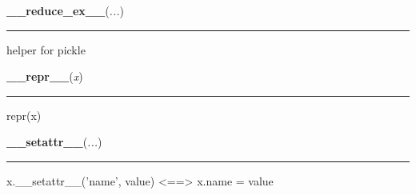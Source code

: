    \label{object:__reduce_ex__}

    \vspace{0.5ex}

    \begin{boxedminipage}{\textwidth}

    \raggedright \textbf{\_\_reduce\_ex\_\_}(\textit{...})

    \vspace{-1.5ex}

    \rule{\textwidth}{0.5\fboxrule}
    helper for pickle

    \vspace{1ex}

    \end{boxedminipage}

    \label{object:__repr__}

    \vspace{0.5ex}

    \begin{boxedminipage}{\textwidth}

    \raggedright \textbf{\_\_repr\_\_}(\textit{x})

    \vspace{-1.5ex}

    \rule{\textwidth}{0.5\fboxrule}
    repr(x)

    \vspace{1ex}

    \end{boxedminipage}

    \label{object:__setattr__}

    \vspace{0.5ex}

    \begin{boxedminipage}{\textwidth}

    \raggedright \textbf{\_\_setattr\_\_}(\textit{...})

    \vspace{-1.5ex}

    \rule{\textwidth}{0.5\fboxrule}
    x.\_\_setattr\_\_('name', value) {\textless}=={\textgreater} x.name = 
    value

    \vspace{1ex}

    \end{boxedminipage}

    \label{object:__str__}

